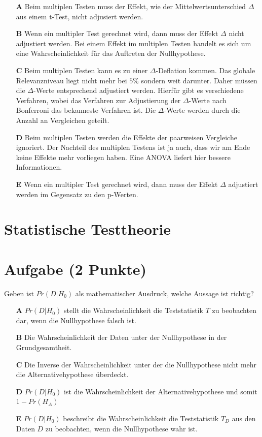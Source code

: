 \documentclass[a4paper, 9pt]{scrartcl}\usepackage[]{graphicx}\usepackage[]{xcolor}
\begin{document}
\begin{enumerate}
\item [\textbf{A} \msquare] Beim multiplen Testen muss der Effekt, wie der Mittelwertsunterschied $\Delta$ aus einem t-Test, nicht adjusiert werden.
\item [\textbf{B} \msquare] Wenn ein multipler Test gerechnet wird, dann muss der Effekt $\Delta$ nicht adjustiert werden. Bei einem Effekt im multiplen Testen handelt es sich um eine Wahrscheinlichkeit für das Auftreten der Nullhypothese.
\item [\textbf{C} \msquare] Beim multiplen Testen kann es zu einer $\Delta$-Deflation kommen. Das globale Relevanzniveau liegt nicht mehr bei $5\%$ sondern weit darunter. Daher müssen die $\Delta$-Werte entsprechend adjustiert werden. Hierfür gibt es verschiedene Verfahren, wobei das Verfahren zur Adjustierung der $\Delta$-Werte nach Bonferroni das bekanneste Verfahren ist. Die $\Delta$-Werte werden durch die Anzahl an Vergleichen geteilt.
\item [\textbf{D} \msquare] Beim multiplen Testen werden die Effekte der paarweisen Vergleiche ignoriert. Der Nachteil des multiplen Testens ist ja auch, dass wir am Ende keine Effekte mehr vorliegen haben. Eine ANOVA liefert hier bessere Informationen.
\item [\textbf{E} \msquare] Wenn ein multipler Test gerechnet wird, dann muss der Effekt $\Delta$ adjustiert werden im Gegensatz zu den p-Werten.
\end{enumerate}
\section*{Statistische Testtheorie}  

\section{Aufgabe \hfill (2 Punkte)}




Geben ist $Pr(D|H_0)$ als mathematischer Ausdruck, welche Aussage ist richtig?



\begin{enumerate}
\item [\textbf{A} \msquare] $Pr(D|H_0)$ stellt die Wahrscheinlichkeit die Teststatistik $T$ zu beobachten dar, wenn die Nullhypothese falsch ist.
\item [\textbf{B} \msquare] Die Wahrscheinlichkeit der Daten unter der Nullhypothese in der Grundgesamtheit.
\item [\textbf{C} \msquare] Die Inverse der Wahrscheinlichkeit unter der die Nullhypothese nicht mehr die Alternativehypothese überdeckt.
\item [\textbf{D} \msquare] $Pr(D|H_0)$ ist die Wahrscheinlichkeit der Alternativehypothese und somit $1 - Pr(H_A)$
\item [\textbf{E} \msquare] $Pr(D|H_0)$ beschreibt die Wahrscheinlichkeit die Teststatistik $T_D$ aus den Daten $D$ zu beobachten, wenn die Nullhypothese wahr ist.
\end{enumerate}
\end{document}
